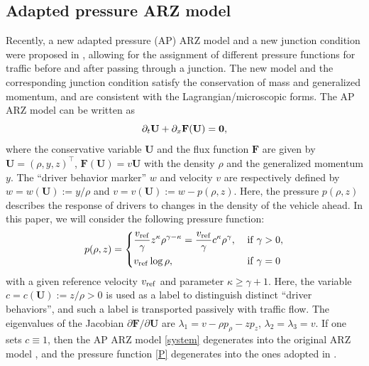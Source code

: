 \documentclass[times,final]{elsarticle}
\numberwithin{equation}{section}
\theoremstyle{definition}
\theoremstyle{remark}
\newcommand{\BU}{\mathbf{U}}
\newcommand{\BF}{\mathbf{F}}
\begin{document}
\subsection{Adapted pressure ARZ model}\label{sec:88}

Recently, a new adapted pressure (AP) ARZ model and a new junction condition were proposed in \cite{gottlich2021second}, allowing for the assignment of different pressure functions for traffic before and after passing through a junction. 
The new model and the corresponding junction condition satisfy the conservation of mass and generalized momentum, and are consistent with the Lagrangian/microscopic forms. 
The AP ARZ model can be written as
\begin{equation}\label{system}
	\partial_t \BU + \partial_x \BF(\BU) = {\bf 0},
\end{equation}
where the conservative variable $\BU$ and the flux function $\BF$ are given by $\BU = (\rho, y, z)^\top$, $\BF(\BU) = v \BU$ with the density $\rho$ and the generalized momentum $y$. The ``driver behavior marker'' $w$ and velocity $v$ are respectively defined by
$w = w(\BU) := y/\rho$ and $v = v(\BU) := w - p(\rho, z)$.
Here, the pressure $p(\rho, z)$ describes the response of drivers to changes in the density of the vehicle ahead. In this paper, we will consider the following pressure function:
\begin{equation}\label{P}
	p(\rho, z) = \left\{
	\begin{aligned}
		& \frac{v_{\rm ref}}{\gamma} z^\kappa \rho^{\gamma-\kappa}
		=
		\frac{v_{\rm ref}}{\gamma} c^\kappa \rho^\gamma, \; && {\rm if} \; \gamma > 0, \\
		& v_{\rm ref} \log{\rho}, \; && {\rm if} \; \gamma = 0
	\end{aligned}
	\right.
\end{equation}
with a given reference velocity $v_{\rm ref}$ and parameter $\kappa \ge \gamma+1$.
Here, the variable $c = c(\BU) := z/\rho > 0$ is used as a label to distinguish distinct ``driver behaviors'', and such a label is transported passively with traffic flow. The eigenvalues of the Jacobian $\partial \BF/\partial \BU$ are $\lambda_1 = v-\rho p_\rho - z p_z$, $\lambda_2 = \lambda_3 = v$. 
If one sets $c \equiv 1$, then the AP ARZ model \eqref{system} degenerates into the original ARZ model \cite{aw2000resurrection}, and the pressure function \eqref{P} degenerates into the ones adopted in \cite{aw2000resurrection,BagneriniRascle2003,garavello2006traffic,herty2006optimization,haut2007second,chalons2007transport,FlynnKasimovNaveRosalesSeibold2009,betancourt2018random,buli2020discontinuous}.
\end{document}

